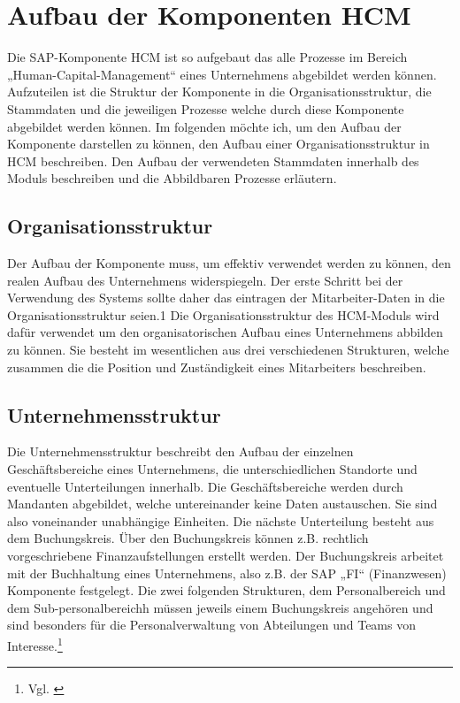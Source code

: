 
\section{Aufbau der Komponenten HCM} 
\label{sec:aufbauderkomponenten}

Die SAP-Komponente HCM ist so aufgebaut das alle Prozesse im Bereich „Human-Capital-Management“ eines Unternehmens abgebildet werden können. Aufzuteilen ist die Struktur der Komponente in die Organisationsstruktur, die Stammdaten und die jeweiligen Prozesse welche durch diese Komponente abgebildet werden können. Im folgenden möchte ich, um den Aufbau der Komponente darstellen zu können, den Aufbau einer Organisationsstruktur in HCM beschreiben. Den Aufbau der verwendeten Stammdaten innerhalb des Moduls beschreiben und die Abbildbaren Prozesse erläutern.

\subsection{Organisationsstruktur}
Der Aufbau der Komponente muss, um effektiv verwendet werden zu können, den realen Aufbau des Unternehmens widerspiegeln. Der erste Schritt bei der Verwendung des Systems sollte daher das eintragen der Mitarbeiter-Daten in die Organisationsstruktur seien.1 Die Organisationsstruktur des HCM-Moduls wird dafür verwendet um den organisatorischen Aufbau eines Unternehmens abbilden zu können. Sie besteht im wesentlichen aus drei verschiedenen Strukturen, welche zusammen die die Position und Zuständigkeit eines Mitarbeiters beschreiben. 

\subsection{Unternehmensstruktur}
Die Unternehmensstruktur beschreibt den Aufbau der einzelnen Geschäftsbereiche eines Unternehmens, die unterschiedlichen Standorte und eventuelle Unterteilungen innerhalb. Die Geschäftsbereiche werden durch Mandanten abgebildet, welche untereinander keine Daten austauschen. Sie sind also voneinander unabhängige Einheiten. Die nächste Unterteilung besteht aus dem Buchungskreis. Über den Buchungskreis können z.B. rechtlich vorgeschriebene Finanzaufstellungen erstellt werden. Der Buchungskreis arbeitet mit der Buchhaltung eines Unternehmens, also z.B. der SAP „FI“ (Finanzwesen) Komponente festgelegt. Die zwei folgenden Strukturen, dem Personalbereich und dem Sub-personalbereichh müssen jeweils einem Buchungskreis angehören und sind besonders für die Personalverwaltung von Abteilungen und Teams von Interesse.\footnote{Vgl. \cite{SAPSE2024a}}

